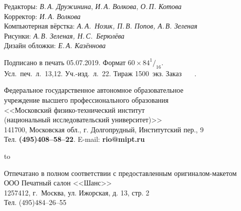 {\footnotesize\raggedright

Редакторы: {\it В.\,А. Дружинина}, {\it И.\,А. Волкова}, 
{\it О.\,П. Котова}\\
Корректор: {\it И.\,А. Волкова}\\
Компьютерная вёрстка: {\it А.\,А.~Нозик, П.\,В. Попов, А.\,В. Зеленая}\\
Рисунки: {\it А.\,В. Зеленая, Н.\,С.~Берюлёва}\\
Дизайн обложки: {\it Е.\,А. Казённова}

\medskip

Подписано в печать 05.07.2019. Формат $60\times84^1{/}_{16}$.\\
Усл.~печ.~л.~13,12. Уч.-изд.~л.~22. Тираж 1500~экз. Заказ \textnumero~~~.

\medskip

Федеральное государственное автономное образовательное\\
учреждение высшего профессионального образования\\
<<Московский физико-технический институт\\
(национальный исследовательский университет)>>\\
141700, Московская обл., г. Долгопрудный, Институтский пер., 9\\
Тел. {\bf (495)408--58--22}. E-mail: {\bf rio@mipt.ru}

\medskip

\hfil \hbox to \textwidth{\hrulefill}\par

Отпечатано в полном соответствии с предоставленным оригиналом-макетом\\
ООО Печатный салон <<Шанс>>\\
1257412, г.~Москва, ул. Ижорская, д. 13, стр. 2\\
Тел. (495)484--26--55

}

